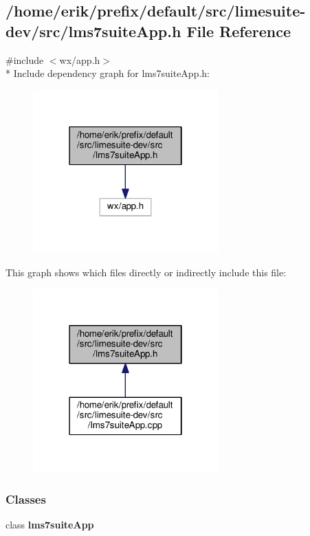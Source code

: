 \subsection{/home/erik/prefix/default/src/limesuite-\/dev/src/lms7suite\+App.h File Reference}
\label{lms7suiteApp_8h}
{\ttfamily \#include $<$wx/app.\+h$>$}\\*
Include dependency graph for lms7suite\+App.\+h\+:
\nopagebreak
\begin{figure}[H]
\begin{center}
\leavevmode
\includegraphics[width=202pt]{d0/df8/lms7suiteApp_8h__incl}
\end{center}
\end{figure}
This graph shows which files directly or indirectly include this file\+:
\nopagebreak
\begin{figure}[H]
\begin{center}
\leavevmode
\includegraphics[width=202pt]{dd/d73/lms7suiteApp_8h__dep__incl}
\end{center}
\end{figure}
\subsubsection*{Classes}
\begin{DoxyCompactItemize}
\item 
class {\bf lms7suite\+App}
\end{DoxyCompactItemize}

